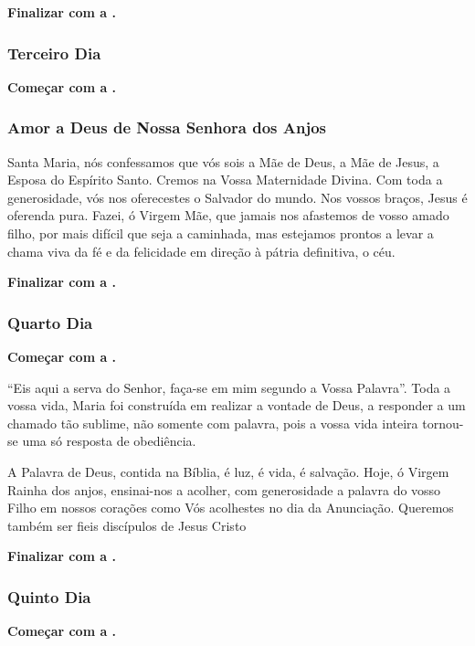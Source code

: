 \documentclass[a4paper,12pt]{extarticle} \usepackage[utf8]{inputenc}
\begin{document}
\textbf{Finalizar com a .}


\subsubsection{Terceiro Dia}

\textbf{Começar com a .}

\subsubsection*{Amor a Deus de Nossa Senhora dos Anjos}

Santa Maria, nós confessamos que vós sois a Mãe de Deus, a Mãe de Jesus, a Esposa do Espírito Santo. Cremos na Vossa Maternidade Divina. Com toda a generosidade, vós nos oferecestes o Salvador do mundo. Nos vossos braços, Jesus é oferenda pura. Fazei, ó Virgem Mãe, que jamais nos afastemos de vosso amado filho, por mais difícil que seja a caminhada, mas estejamos prontos a levar a chama viva da fé e da felicidade em direção à pátria definitiva, o céu.

\textbf{Finalizar com a .}


\subsubsection{Quarto Dia}

\textbf{Começar com a .}

“Eis aqui a serva do Senhor, faça-se em mim segundo a Vossa Palavra”. Toda a vossa vida, Maria foi construída em realizar a vontade de Deus, a responder a um chamado tão sublime, não somente com palavra, pois a vossa vida inteira tornou-se uma só resposta de obediência.

A Palavra de Deus, contida na Bíblia, é luz, é vida, é salvação. Hoje, ó Virgem Rainha dos anjos, ensinai-nos a acolher, com generosidade a palavra do vosso Filho em nossos corações como Vós acolhestes no dia da Anunciação. Queremos também ser fieis discípulos de Jesus Cristo

\textbf{Finalizar com a .}


\subsubsection{Quinto Dia}

\textbf{Começar com a .}
\end{document}
